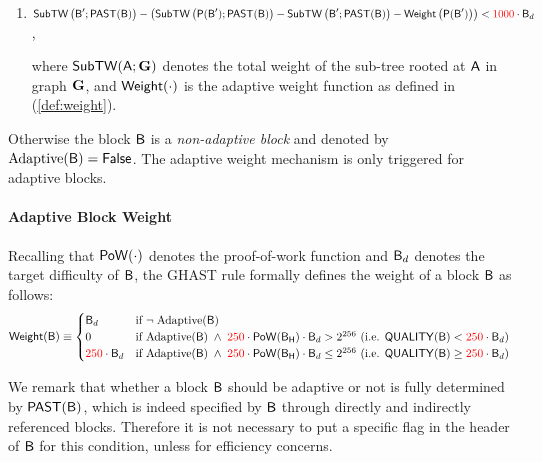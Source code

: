 {\begin{enumerate}[]
		\item $\mathsf{SubTW}\left(\textsf{B}';\mathsf{PAST}(\textsf{B})\right) - \left( \mathsf{SubTW}\left(\mathsf{P}(\textsf{B}');\mathsf{PAST}(\textsf{B})\right)-\mathsf{SubTW}\left(\textsf{B}';\mathsf{PAST}(\textsf{B})\right)-\mathsf{Weight}\left(\mathsf{P}(\textsf{B}')\right)\right) < {\color{red}1000} \cdot \textsf{B}_d$,

		where $\mathsf{SubTW}(\textsf{A};\textbf{G})$ denotes the total weight of the sub-tree rooted at $\textsf{A}$ in graph $\textbf{G}$,
		and $\mathsf{Weight}(\cdot)$ is the adaptive weight function as defined in (\ref{def:weight}).
	\end{enumerate}


	Otherwise the block $\textsf{B}$ is a \emph{non-adaptive block} and denoted by $\mathrm{Adaptive}(\textsf{B})=\mathsf{False}$. 
	The adaptive weight mechanism is only triggered for adaptive blocks.


	


	\paragraph{Adaptive Block Weight}

	Recalling that $\mathsf{PoW}(\cdot)$ denotes the proof-of-work function  and $\textsf{B}_d$ denotes the target difficulty of $\textsf{B}$, 
	the GHAST rule formally defines the weight of a block $\textsf{B}$ as follows:
	\begin{align}\label{def:weight}
		\mathsf{Weight}(\textsf{B}) \equiv 
		\begin{cases}
		\textsf{B}_d       & \text{if } \neg\; \mathrm{Adaptive}(\textsf{B})                                 \\
		0       & \text{if } \mathrm{Adaptive}(\textsf{B}) \;\land\; {\color{red}250} \cdot \mathsf{PoW}(\textsf{B}_{\textsf{H}}) \cdot \textsf{B}_d > {2^{256}} \text{ (i.e. $\mathsf{QUALITY}(\textsf{B}) < {\color{red}250}  \cdot \textsf{B}_d$)} \\
		{\color{red}250}\cdot \textsf{B}_d & \text{if } \mathrm{Adaptive}(\textsf{B}) \;\land\; {\color{red}250} \cdot \mathsf{PoW}(\textsf{B}_{\textsf{H}}) \cdot \textsf{B}_d  \le  {2^{256}} \text{ (i.e. $\mathsf{QUALITY}(\textsf{B}) \ge {\color{red}250}  \cdot \textsf{B}_d$)}   
		\end{cases} 
	\end{align}   


	We remark that whether a block $\textsf{B}$ should be adaptive or not is fully determined by $\mathsf{PAST}(\textsf{B})$, which is indeed specified by $\textsf{B}$ through directly and indirectly referenced blocks.
	Therefore it is not necessary to put a specific flag in the header of $\textsf{B}$ for this condition, unless for efficiency concerns. 
}


